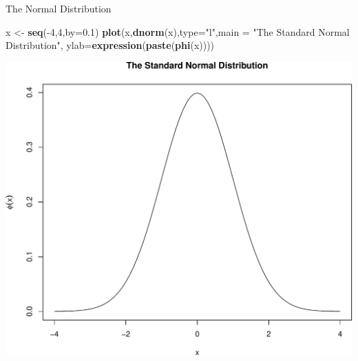 \documentclass[9pt,ignorenonframetext,]{beamer}
\newenvironment{Shaded}{\begin{snugshade}}{\end{snugshade}}
\newcommand{\KeywordTok}[1]{\textcolor[rgb]{0.13,0.29,0.53}{\textbf{{#1}}}}
\newcommand{\DataTypeTok}[1]{\textcolor[rgb]{0.13,0.29,0.53}{{#1}}}
\newcommand{\DecValTok}[1]{\textcolor[rgb]{0.00,0.00,0.81}{{#1}}}
\newcommand{\FloatTok}[1]{\textcolor[rgb]{0.00,0.00,0.81}{{#1}}}
\newcommand{\StringTok}[1]{\textcolor[rgb]{0.31,0.60,0.02}{{#1}}}
\newcommand{\NormalTok}[1]{{#1}}
\begin{document}
\begin{frame}[fragile]{The Normal Distribution}

\begin{Shaded}
\begin{Highlighting}[]
\NormalTok{x <-}\StringTok{ }\KeywordTok{seq}\NormalTok{(-}\DecValTok{4}\NormalTok{,}\DecValTok{4}\NormalTok{,}\DataTypeTok{by=}\FloatTok{0.1}\NormalTok{)}
\KeywordTok{plot}\NormalTok{(x,}\KeywordTok{dnorm}\NormalTok{(x),}\DataTypeTok{type=}\StringTok{"l"}\NormalTok{,}\DataTypeTok{main =} \StringTok{"The Standard Normal Distribution"}\NormalTok{, }
     \DataTypeTok{ylab=}\KeywordTok{expression}\NormalTok{(}\KeywordTok{paste}\NormalTok{(}\KeywordTok{phi}\NormalTok{(x))))}
\end{Highlighting}
\end{Shaded}

\includegraphics{class2-jan11_files/figure-beamer/unnamed-chunk-5-1.pdf}

\end{frame}
\end{document}
